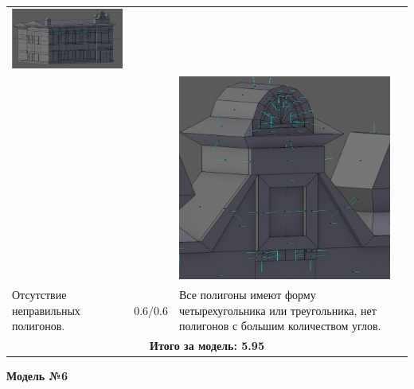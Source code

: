 \begin{longtable}{|p{4cm}|p{2.5cm}|p{7.5cm}|}
    \includegraphics[width=7cm]{src/norm_9}\\
    & & \includegraphics[width=7cm]{src/norm_10}\\
    \hline
    Отсутствие неправильных полигонов. & 0.6/0.6 & Все полигоны имеют форму четырехугольника или треугольника, нет полигонов с большим количеством углов. \\
    \hline
    \multicolumn{3}{|c|}{\textbf{Итого за модель: 5.95}} \\
    \hline
\end{longtable}

\begin{center}
    \textbf{Модель №6}
\end{center}

